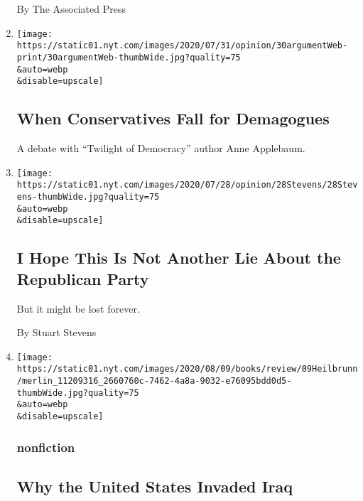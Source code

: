 \begin{enumerate}
  By The Associated Press
\item
  \href{/2020/07/30/opinion/the-argument-authoritarianism-anne-applebaum.html}{}

  \texttt{[image: https://static01.nyt.com/images/2020/07/31/opinion/30argumentWeb-print/30argumentWeb-thumbWide.jpg?quality=75\\\&auto=webp\\\&disable=upscale]}

  \hypertarget{when-conservatives-fall-for-demagogues}{%
  \subsection{When Conservatives Fall for
  Demagogues}\label{when-conservatives-fall-for-demagogues}}

  A debate with ``Twilight of Democracy'' author Anne Applebaum.
\item
  \href{/2020/07/29/opinion/trump-republican-party-racism.html}{}

  \texttt{[image: https://static01.nyt.com/images/2020/07/28/opinion/28Stevens/28Stevens-thumbWide.jpg?quality=75\\\&auto=webp\\\&disable=upscale]}

  \hypertarget{i-hope-this-is-not-another-lie-about-the-republican-party}{%
  \subsection{I Hope This Is Not Another Lie About the Republican
  Party}\label{i-hope-this-is-not-another-lie-about-the-republican-party}}

  But it might be lost forever.

  By Stuart Stevens
\item
  \href{/2020/07/28/books/review/to-start-a-war-robert-draper.html}{}

  \texttt{[image: https://static01.nyt.com/images/2020/08/09/books/review/09Heilbrunn/merlin\_11209316\_2660760c-7462-4a8a-9032-e76095bdd0d5-thumbWide.jpg?quality=75\\\&auto=webp\\\&disable=upscale]}

  \hypertarget{nonfiction}{%
  \subsubsection{nonfiction}\label{nonfiction}}

  \hypertarget{why-the-united-states-invaded-iraq}{%
  \subsection{Why the United States Invaded
  Iraq}\label{why-the-united-states-invaded-iraq}}


\end{enumerate}
